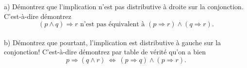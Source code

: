 \documentclass[12pt]{article}
\newcommand{\REMISE}[1]{}
\newcommand{\rouge}[1]{\textcolor{red}{#1}}
\newcommand{\V}{\mbox{\tt v}}
\newcommand{\F}{\mbox{\tt f}}
\newcommand{\non}{\neg}                  %
\newcommand{\et}{\wedge}                 %
\newcommand{\ou}{\vee}                   %
\newcommand{\implique}{\Rightarrow}      %
\newcommand{\ssi}{\Leftrightarrow}       %
\newcounter{exercice}\newcommand{\exercice}{\bigskip \addtocounter{exercice}{1}\noindent \textbf{Exercice \theexercice}\\}
\newcommand{\reponse}[1]{\REMISE{\vspace{.5cm}\noindent\textbf{Réponse : } #1 \vfill}}
\begin{document}
\exercice
a) Démontrez que l'implication n'est pas distributive à droite sur la conjonction. C'est-à-dire démontrez
$$(p\wedge q)\implique r \mbox{ n'est pas équivalent à } (p\implique r ) \wedge (q\implique r).$$
\\b) Démontrez que pourtant,  l'implication est  distributive à gauche sur la conjonction! C'est-à-dire démontrez par table de vérité qu'on a bien
$$p\implique (q\wedge r)\  \ssi\  (p\implique q ) \wedge (p\implique r).$$
\reponse{
}


\end{document}
